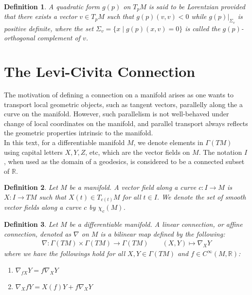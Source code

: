 \documentclass[11pt]{book}
\theoremstyle{break}
\theoremstyle{break}
\newtheorem{defn}{Definition}[corL]
\newcommand{\R}{\mathbb{R}}
\begin{document}
\begin{defn}
A quadratic form $g(p)$ on $T_pM$ is said to be Lorentzian provided that there exists a vector $v\in T_pM$ such that $g(p)(v,v) < 0$ while $g(p)|_{\Sigma_v}$ is positive definite, where the set $\Sigma_v = \{x \mid g(p)(x,v) = 0\}$ is called the $g(p)$-orthogonal complement of $v$.  
\end{defn}

\newpage
\section[The Levi-Civita Connection]{\color{red}The Levi-Civita Connection\color{black}}
The motivation of defining a connection on a manifold arises as one wants to transport local geometric objects, such as tangent vectors, parallelly along the a curve on the manifold. However, such parallelism is not well-behaved under change of local coordinates on the manifold, and parallel transport always reflects the geometric properties intrinsic to the manifold. \\

In this text, for a differentiable manifold $M$, we denote elements in $\Gamma(TM)$ using capital letters $X, Y, Z$, etc, which are the vector fields on $M$. The notation $I$, when used as the domain of a geodesics, is considered to be a connected subset of $\R$. 

\begin{defn}
Let $M$ be a manifold. A vector field along a curve $c:I \to M$ is $X:I \to TM$ such that $X(t) \in T_{c(t)}M$ for all $t \in I$. We denote the set of smooth vector fields along a curve $c$ by $\chi_c(M)$. 
\end{defn}


\begin{defn}
Let $M$ be a differentiable manifold. A linear connection, or affine connection, denoted as $\nabla$ on $M$ is a bilinear map defined by the following:
\begin{align*}
\nabla: \Gamma(TM) \times \Gamma(TM) \to \Gamma(TM) \qquad (X,Y)\mapsto \nabla_XY
\end{align*}
where we have the followings hold for all $X,Y \in \Gamma(TM)$ and $f \in C^\infty(M,\R)$:
\begin{enumerate}[topsep=3pt,itemsep=-1ex,partopsep=1ex,parsep=1ex]
\item $\nabla_{fX}Y = f\nabla_X Y$
\item $\nabla_XfY = X(f)Y + f\nabla_XY$ 
\end{enumerate}
\end{defn}
\end{document}
